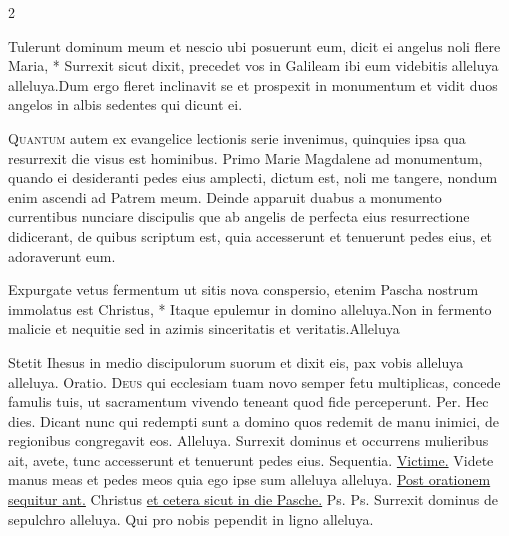 \begin{multicols*}{2}
\begin{responsory}
{Tulerunt dominum meum et nescio ubi posuerunt eum, dicit ei angelus noli flere Maria, * Surrexit sicut dixit, precedet vos in Galileam ibi eum videbitis alleluya alleluya.}{Dum ergo fleret inclinavit se et prospexit in monumentum et vidit duos angelos in albis sedentes qui dicunt ei.}
\end{responsory}%
\lettrine[lines=2]{\zallmancaps \color{Red} Q}{uantum} autem ex evangelice lectionis serie invenimus, quinquies ipsa qua resurrexit die visus est hominibus. Primo Marie Magdalene ad monumentum, quando ei desideranti pedes eius amplecti, dictum est, noli me tangere, nondum enim ascendi ad Patrem meum. Deinde apparuit duabus a monumento currentibus nunciare discipulis que ab angelis de perfecta eius resurrectione didicerant, de quibus scriptum est, quia accesserunt et tenuerunt pedes eius, et adoraverunt eum.
\begin{responsory-final}
{Expurgate vetus fermentum ut sitis nova conspersio, etenim Pascha nostrum immolatus est Christus, * Itaque epulemur in domino alleluya.}{Non in fermento malicie et nequitie sed in azimis sinceritatis et veritatis.}{Alleluya}
\end{responsory-final}%
 Stetit Ihesus in medio discipulorum suorum et dixit eis, pax vobis alleluya alleluya. {\color{Red} Oratio.}
\lettrine[lines=2]{\zallmancaps \color{Blue} D}{eus} qui ecclesiam tuam novo semper fetu multiplicas, concede famulis tuis, ut sacramentum vivendo teneant quod fide perceperunt. Per.
 \R Hec dies. \V Dicant nunc qui redempti sunt a domino quos redemit de manu inimici, de regionibus congregavit eos. Alleluya. \V Surrexit dominus et occurrens mulieribus ait, avete, tunc accesserunt et tenuerunt pedes eius. {\color{Red} Sequentia.} \hyperlink{victime-paschali-laudes}{Victime.}
 Videte manus meas et pedes meos quia ego ipse sum alleluya alleluya.
\newline \ul{Post orationem sequitur ant.} Christus \ul{et cetera sicut in die Pasche.}
  {\color{Red} Ps.}  {\color{Red} Ps.}  \V Surrexit dominus de sepulchro alleluya. \R Qui pro nobis pependit in ligno alleluya.

\end{multicols*}

